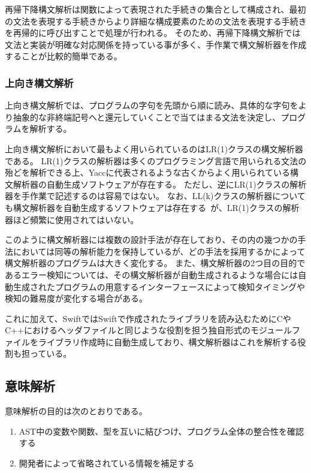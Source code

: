 再帰下降構文解析は関数によって表現された手続きの集合として構成され、最初の文法を表現する手続きからより詳細な構成要素のための文法を表現する手続きを再帰的に呼び出すことで処理が行われる。
そのため、再帰下降構文解析では文法と実装が明確な対応関係を持っている事が多く、手作業で構文解析器を作成することが比較的簡単である。

\subsubsection{上向き構文解析}

上向き構文解析では、プログラムの字句を先頭から順に読み、具体的な字句をより抽象的な非終端記号へと還元していくことで当てはまる文法を決定し、プログラムを解析する。

上向き構文解析において最もよく用いられているのはLR(1)クラスの構文解析器である。
LR(1)クラスの解析器は多くのプログラミング言語で用いられる文法の殆どを解析できる上、Yaccに代表されるような古くからよく用いられている構文解析器の自動生成ソフトウェアが存在する。
ただし、逆にLR(1)クラスの解析器を手作業で記述するのは容易ではない。
なお、LL(k)クラスの解析器についても構文解析器を自動生成するソフトウェアは存在する~\cite{antlr}が、LR(1)クラスの解析器ほど頻繁に使用されてはいない。

\vspace{2em}

このように構文解析器には複数の設計手法が存在しており、その内の幾つかの手法においては同等の解析能力を保持しているが、どの手法を採用するかによって構文解析器のプログラムは大きく変化する。
また、構文解析器の2つ目の目的であるエラー検知については、その構文解析器が自動生成されるような場合には自動生成されたプログラムの用意するインターフェースによって検知タイミングや検知の難易度が変化する場合がある。

これに加えて、SwiftではSwiftで作成されたライブラリを読み込むためにCやC++におけるヘッダファイルと同じような役割を担う独自形式のモジュールファイルをライブラリ作成時に自動生成しており、構文解析器はこれを解析する役割も担っている。

\subsection{意味解析}
\label{refinement:structure:sema}

意味解析の目的は次のとおりである。

\begin{enumerate}
    \item AST中の変数や関数、型を互いに結びつけ、プログラム全体の整合性を確認する
    \item 開発者によって省略されている情報を補足する
\end{enumerate}

